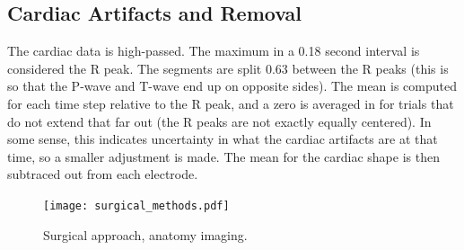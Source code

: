 \documentclass[]{article}
\begin{document}
\subsection{Cardiac Artifacts and Removal}
The cardiac data is high-passed.
The maximum in a 0.18 second interval is considered the R peak.
The segments are split 0.63 between the R peaks (this is so that the P-wave and T-wave end up on opposite sides).
The mean is computed for each time step relative to the R peak, and a zero is averaged in for trials that do not extend that far out (the R peaks are not exactly equally centered).
In some sense, this indicates uncertainty in what the cardiac artifacts are at that time, so a smaller adjustment is made.
The mean for the cardiac shape is then subtraced out from each electrode.
\label{section:cardiac}
\begin{figure}[H]
\begin{center}
\texttt{[image: surgical\_methods.pdf]}
\caption{Surgical approach, anatomy imaging.}
\label{fig:surgical}
\end{center}
\end{figure}
\end{document}
